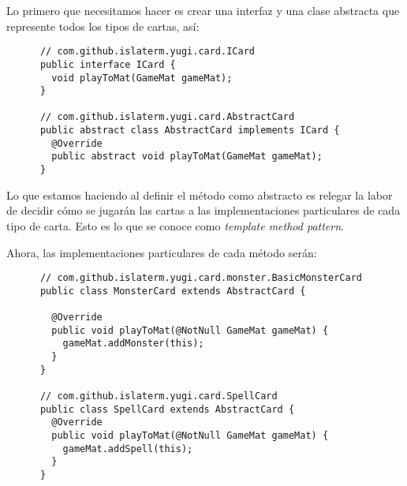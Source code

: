   \begin{Answer}[ref={ex:template-1}]
    Lo primero que necesitamos hacer es crear una interfaz y una clase abstracta que 
    represente todos los tipos de cartas, así:
    \begin{verbatim}
      // com.github.islaterm.yugi.card.ICard
      public interface ICard {
        void playToMat(GameMat gameMat);
      }

      // com.github.islaterm.yugi.card.AbstractCard
      public abstract class AbstractCard implements ICard {
        @Override
        public abstract void playToMat(GameMat gameMat);
      }
    \end{verbatim}

    Lo que estamos haciendo al definir el método como abstracto es relegar la labor de 
    decidir cómo se jugarán las cartas a las implementaciones particulares de cada tipo de
    carta.
    Esto es lo que se conoce como \textit{template method pattern}.

    Ahora, las implementaciones particulares de cada método serán:
    \begin{verbatim}
      // com.github.islaterm.yugi.card.monster.BasicMonsterCard
      public class MonsterCard extends AbstractCard {

        @Override
        public void playToMat(@NotNull GameMat gameMat) {
          gameMat.addMonster(this);
        }
      }

      // com.github.islaterm.yugi.card.SpellCard
      public class SpellCard extends AbstractCard {
        @Override
        public void playToMat(@NotNull GameMat gameMat) {
          gameMat.addSpell(this);
        }
      }
    \end{verbatim}
  \end{Answer}
  
